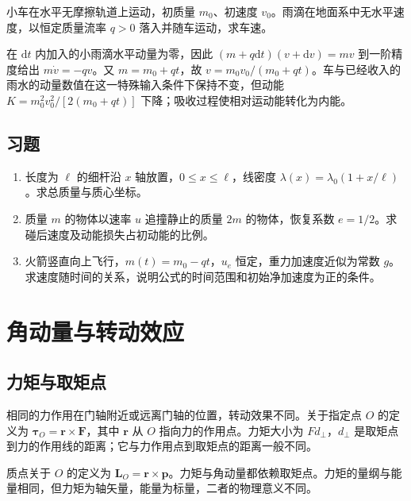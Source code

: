 \documentclass[UTF8,12pt,a4paper,fontset=fandol]{ctexbook}
\begin{document}
\begin{example}[静止雨滴落入小车]
小车在水平无摩擦轨道上运动，初质量 $m_0$、初速度 $v_0$。雨滴在地面系中无水平速度，以恒定质量流率 $q>0$ 落入并随车运动，求车速。
\end{example}
\begin{solve}
在 $\mathrm dt$ 内加入的小雨滴水平动量为零，因此 $(m+q\mathrm dt)(v+\mathrm dv)=mv$ 到一阶精度给出 $m\dot v=-qv$。又 $m=m_0+qt$，故 $v=m_0v_0/(m_0+qt)$。车与已经收入的雨水的动量数值在这一特殊输入条件下保持不变，但动能 $K=m_0^2v_0^2/[2(m_0+qt)]$ 下降；吸收过程使相对运动能转化为内能。
\end{solve}

\section{习题}
\begin{enumerate}[label=\thechapter.\arabic*,ref=\thechapter.\arabic*]
\item\label{exr:mech-com} 长度为 $\ell$ 的细杆沿 $x$ 轴放置，$0\le x\le\ell$，线密度 $\lambda(x)=\lambda_0(1+x/\ell)$。求总质量与质心坐标。
\item\label{exr:mech-restitution} 质量 $m$ 的物体以速率 $u$ 追撞静止的质量 $2m$ 的物体，恢复系数 $e=1/2$。求碰后速度及动能损失占初动能的比例。
\item\label{exr:mech-rocket-gravity} 火箭竖直向上飞行，$m(t)=m_0-qt$，$u_e$ 恒定，重力加速度近似为常数 $g$。求速度随时间的关系，说明公式的时间范围和初始净加速度为正的条件。
\end{enumerate}

\chapter{角动量与转动效应}
\label{chap:mech-angular}

\section{力矩与取矩点}
相同的力作用在门轴附近或远离门轴的位置，转动效果不同。关于指定点 $O$ 的定义为 $\boldsymbol\tau_O=\mathbf r\times\mathbf F$，其中 $\mathbf r$ 从 $O$ 指向力的作用点。力矩大小为 $Fd_\perp$，$d_\perp$ 是取矩点到力的作用线的距离；它与力作用点到取矩点的距离一般不同。

质点关于 $O$ 的定义为 $\mathbf L_O=\mathbf r\times\mathbf p$。力矩与角动量都依赖取矩点。力矩的量纲与能量相同，但力矩为轴矢量，能量为标量，二者的物理意义不同。
\end{document}
